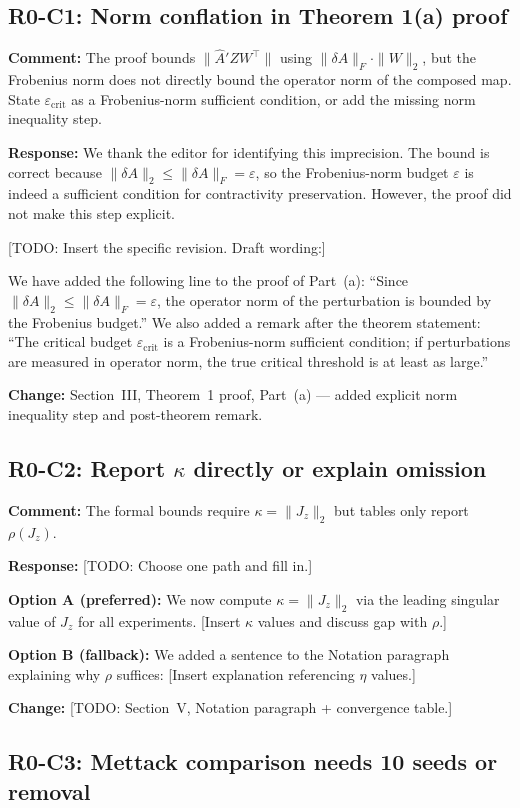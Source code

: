 \documentclass[11pt]{article}
\newcommand{\reviewer}[1]{\subsection*{\textcolor{revcolor}{#1}}}
\newcommand{\comment}[1]{\textcolor{revcolor}{\textbf{Comment:} #1}}
\newcommand{\response}[1]{\textcolor{responsecolor}{\textbf{Response:} #1}}
\newcommand{\change}[1]{\textcolor{changecolor}{\textbf{Change:} #1}}
\begin{document}
\reviewer{R0-C1: Norm conflation in Theorem 1(a) proof}

\comment{The proof bounds $\|\hat{A}' Z W^\top\|$ using $\|\delta A\|_F \cdot \|W\|_2$, but the Frobenius norm does not directly bound the operator norm of the composed map. State $\varepsilon_{\mathrm{crit}}$ as a Frobenius-norm sufficient condition, or add the missing norm inequality step.}

\response{
We thank the editor for identifying this imprecision. The bound is correct because $\|\delta A\|_2 \leq \|\delta A\|_F = \varepsilon$, so the Frobenius-norm budget $\varepsilon$ is indeed a sufficient condition for contractivity preservation. However, the proof did not make this step explicit.

[TODO: Insert the specific revision. Draft wording:]

We have added the following line to the proof of Part~(a): ``Since $\|\delta A\|_2 \leq \|\delta A\|_F = \varepsilon$, the operator norm of the perturbation is bounded by the Frobenius budget.'' We also added a remark after the theorem statement: ``The critical budget $\varepsilon_{\mathrm{crit}}$ is a Frobenius-norm sufficient condition; if perturbations are measured in operator norm, the true critical threshold is at least as large.''
}

\change{Section~III, Theorem~1 proof, Part~(a) --- added explicit norm inequality step and post-theorem remark.}


\reviewer{R0-C2: Report $\kappa$ directly or explain omission}

\comment{The formal bounds require $\kappa = \|J_z\|_2$ but tables only report $\rho(J_z)$.}

\response{
[TODO: Choose one path and fill in.]

\textbf{Option A (preferred):} We now compute $\kappa = \|J_z\|_2$ via the leading singular value of $J_z$ for all experiments. [Insert $\kappa$ values and discuss gap with $\rho$.]

\textbf{Option B (fallback):} We added a sentence to the Notation paragraph explaining why $\rho$ suffices: [Insert explanation referencing $\eta$ values.]
}

\change{[TODO: Section~V, Notation paragraph + convergence table.]}


\reviewer{R0-C3: Mettack comparison needs 10 seeds or removal}
\end{document}
